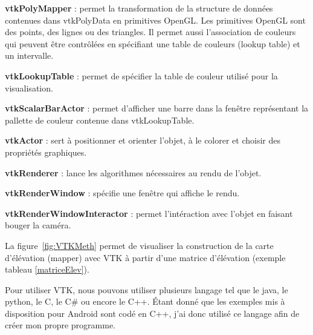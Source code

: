 \documentclass[a4paper,12pt]{article}
\begin{document}
\textbf{vtkPolyMapper} 	: permet la transformation de la structure de données contenues dans vtkPolyData en primitives OpenGL. Les primitives OpenGL sont des points, des lignes ou des triangles. Il permet aussi l'association de couleurs qui peuvent être contrôlées en spécifiant une table de couleurs (lookup table) et un intervalle.
\vspace{0.25cm}

\textbf{vtkLookupTable}  : permet de spécifier la table de couleur utilisé pour la visualisation.
\vspace{0.25cm}

\textbf{vtkScalarBarActor} : permet d'afficher une barre dans la fenêtre représentant la pallette de couleur contenue dans vtkLookupTable.
\vspace{0.25cm}

\textbf{vtkActor} : sert à positionner et orienter l'objet, à le colorer et choisir des propriétés graphiques. 
\vspace{0.25cm}

\textbf{vtkRenderer} : lance les algorithmes nécessaires au rendu de l'objet.
\vspace{0.25cm}

\textbf{vtkRenderWindow} : spécifie une fenêtre qui affiche le rendu.
\vspace{0.25cm}

\textbf{vtkRenderWindowInteractor} : permet l'intéraction avec l'objet en faisant bouger la caméra.

 \vspace{0.25cm}
La figure~\ref{fig:VTKMeth} permet de visualiser la construction de la carte d'élévation (mapper) avec VTK à partir d'une matrice d'élévation (exemple tableau \ref{matriceElev}).

 \vspace{0.25cm}
Pour utiliser VTK, nous pouvons utiliser plusieurs langage tel que le java, le python, le C, le C\# ou encore le C++. Étant donné que les exemples mis à disposition pour Android sont codé en C++, j'ai donc utilisé ce langage afin de créer mon propre programme.
\end{document}

